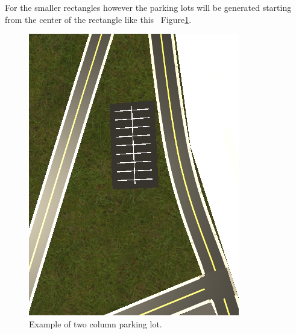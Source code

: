 For the smaller rectangles however the parking lots will be generated starting from the center of the rectangle like this ~Figure\ref{fig:smallparking}.
\begin{figure}[H]
\includegraphics[width=\linewidth]{figure/smallp.PNG}
\caption{Example of two column parking lot.}
\label{fig:smallparking}
\end{figure}

